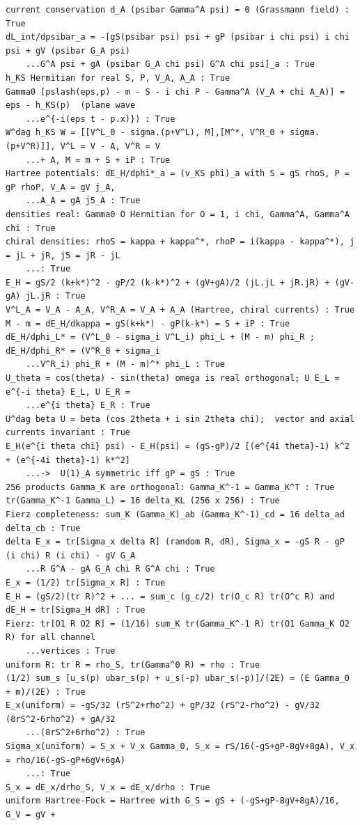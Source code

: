 \documentclass[10pt,a4paper]{article}
\begin{document}
\begin{Verbatim}[fontsize=\small,frame=single,framesep=2mm]
current conservation d_A (psibar Gamma^A psi) = 0 (Grassmann field) : True
dL_int/dpsibar_a = -[gS(psibar psi) psi + gP (psibar i chi psi) i chi psi + gV (psibar G_A psi)
    ...G^A psi + gA (psibar G_A chi psi) G^A chi psi]_a : True
h_KS Hermitian for real S, P, V_A, A_A : True
Gamma0 [pslash(eps,p) - m - S - i chi P - Gamma^A (V_A + chi A_A)] = eps - h_KS(p)  (plane wave
    ...e^{-i(eps t - p.x)}) : True
W^dag h_KS W = [[V^L_0 - sigma.(p+V^L), M],[M^*, V^R_0 + sigma.(p+V^R)]], V^L = V - A, V^R = V
    ...+ A, M = m + S + iP : True
Hartree potentials: dE_H/dphi*_a = (v_KS phi)_a with S = gS rhoS, P = gP rhoP, V_A = gV j_A,
    ...A_A = gA j5_A : True
densities real: Gamma0 O Hermitian for O = 1, i chi, Gamma^A, Gamma^A chi : True
chiral densities: rhoS = kappa + kappa^*, rhoP = i(kappa - kappa^*), j = jL + jR, j5 = jR - jL
    ...: True
E_H = gS/2 (k+k*)^2 - gP/2 (k-k*)^2 + (gV+gA)/2 (jL.jL + jR.jR) + (gV-gA) jL.jR : True
V^L_A = V_A - A_A, V^R_A = V_A + A_A (Hartree, chiral currents) : True
M - m = dE_H/dkappa = gS(k+k*) - gP(k-k*) = S + iP : True
dE_H/dphi_L* = (V^L_0 - sigma_i V^L_i) phi_L + (M - m) phi_R ; dE_H/dphi_R* = (V^R_0 + sigma_i
    ...V^R_i) phi_R + (M - m)^* phi_L : True
U_theta = cos(theta) - sin(theta) omega is real orthogonal; U E_L = e^{-i theta} E_L, U E_R =
    ...e^{i theta} E_R : True
U^dag beta U = beta (cos 2theta + i sin 2theta chi);  vector and axial currents invariant : True
E_H(e^{i theta chi} psi) - E_H(psi) = (gS-gP)/2 [(e^{4i theta}-1) k^2 + (e^{-4i theta}-1) k*^2]
    ...->  U(1)_A symmetric iff gP = gS : True
256 products Gamma_K are orthogonal: Gamma_K^-1 = Gamma_K^T : True
tr(Gamma_K^-1 Gamma_L) = 16 delta_KL (256 x 256) : True
Fierz completeness: sum_K (Gamma_K)_ab (Gamma_K^-1)_cd = 16 delta_ad delta_cb : True
delta E_x = tr[Sigma_x delta R] (random R, dR), Sigma_x = -gS R - gP (i chi) R (i chi) - gV G_A
    ...R G^A - gA G_A chi R G^A chi : True
E_x = (1/2) tr[Sigma_x R] : True
E_H = (gS/2)(tr R)^2 + ... = sum_c (g_c/2) tr(O_c R) tr(O^c R) and dE_H = tr[Sigma_H dR] : True
Fierz: tr[O1 R O2 R] = (1/16) sum_K tr(Gamma_K^-1 R) tr(O1 Gamma_K O2 R) for all channel
    ...vertices : True
uniform R: tr R = rho_S, tr(Gamma^0 R) = rho : True
(1/2) sum_s [u_s(p) ubar_s(p) + u_s(-p) ubar_s(-p)]/(2E) = (E Gamma_0 + m)/(2E) : True
E_x(uniform) = -gS/32 (rS^2+rho^2) + gP/32 (rS^2-rho^2) - gV/32 (8rS^2-6rho^2) + gA/32
    ...(8rS^2+6rho^2) : True
Sigma_x(uniform) = S_x + V_x Gamma_0, S_x = rS/16(-gS+gP-8gV+8gA), V_x = rho/16(-gS-gP+6gV+6gA)
    ...: True
S_x = dE_x/drho_S, V_x = dE_x/drho : True
uniform Hartree-Fock = Hartree with G_S = gS + (-gS+gP-8gV+8gA)/16, G_V = gV +

\end{Verbatim}
\end{document}
